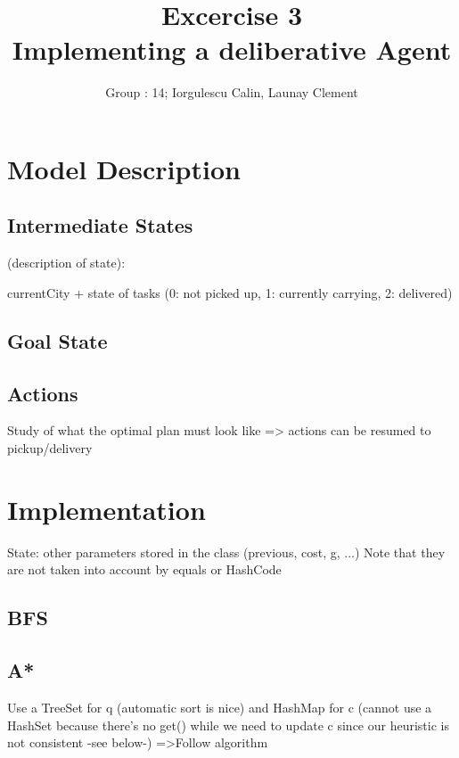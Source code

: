 \documentclass[11pt]{article}
\title{\bf Excercise 3\\ Implementing a deliberative Agent}
\author{Group \textnumero : 14; Iorgulescu Calin, Launay Clement}
\begin{document}
\maketitle

\section{Model Description}

\subsection{Intermediate States}

(description of state):

currentCity + state of tasks (0: not picked up, 1: currently carrying, 2: delivered)


\subsection{Goal State}

\subsection{Actions}

Study of what the optimal plan must look like => actions can be resumed to pickup/delivery


\section{Implementation}

State: other parameters stored in the class (previous, cost, g, ...)
Note that they are not taken into account by equals or HashCode

\subsection{BFS}

\subsection{A*}
Use a TreeSet for q (automatic sort is nice)
and HashMap for c (cannot use a HashSet because there's no get() while we need to update c since our heuristic is not consistent -see below-)
=>Follow algorithm
\end{document}
